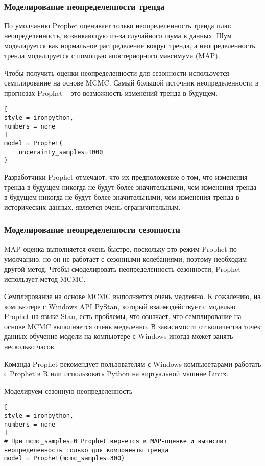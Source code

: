 \documentclass[%
	11pt,
	a4paper,
	utf8,
		]{article}
\begin{document}
\subsubsection{Моделирование неопределенности тренда}

По умолчанию Prophet оценивает только неопределенность тренда плюс неопределенность, возникающую из-за случайного шума в данных. Шум моделируется как нормальное распределение вокруг тренда, а неопределенность тренда моделируется с помощью апостериорного максимума (MAP).

Чтобы получить оценки неопределенности для сезонности используется семплирование на основе MCMC. Самый большой источник неопределенности в прогнозах Prophet -- это возможность изменений тренда в будущем.
\begin{lstlisting}[
style = ironpython,
numbers = none
]
model = Prophet(
    uncerainty_samples=1000
)
\end{lstlisting}

Разработчики Prophet отмечают, что их предположение о том, что изменения тренда в будущем никогда не будут более значительными, чем изменения тренда в будущем никогда не будут более значительными, чем изменения тренда в исторических данных, является очень ограничительным.

\subsubsection{Моделирование неопределенности сезонности}

MAP-оценка выполняется очень быстро, поскольку это режим Prophet по умолчанию, но он не работает с сезонными колебаниями, поэтому необходим другой метод. Чтобы смоделировать неопределенность сезонности, Prophet использует метод MCMC.

Семплирование на основе MCMC выполняется очень медленно. К сожалению, на компьютере с Windows API PyStan, который взаимодействует с моделью Prophet на языке Stan, есть проблемы, что означает, что семплирование на основе MCMC выполняется очень меделенно. В зависимости от количества точек данных обучение модели на компьютере с Windows иногда может занять несколько часов.

Команда Prophet рекомендует пользователям с Windows-компьюетарами работать с Prophet в R или использовать Python на виртуальной машине Linux.

Моделируем сезонную неопределенность
\begin{lstlisting}[
style = ironpython,
numbers = none
]
# При mcmc_samples=0 Prophet вернется к MAP-оценке и вычислит неопределенность только для компоненты тренда
model = Prophet(mcmc_samples=300)
\end{lstlisting}
\end{document}
